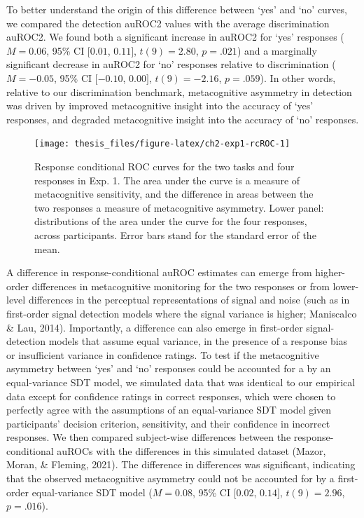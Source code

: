 \documentclass[12pt,twoside]{reedthesis}
\begin{document}
To better understand the origin of this difference between `yes' and `no' curves, we compared the detection auROC2 values with the average discrimination auROC2. We found both a significant increase in auROC2 for `yes' responses (\(M = 0.06\), 95\% CI \([0.01\), \(0.11]\), \(t(9) = 2.80\), \(p = .021\)) and a marginally significant decrease in auROC2 for `no' responses relative to discrimination (\(M = -0.05\), 95\% CI \([-0.10\), \(0.00]\), \(t(9) = -2.16\), \(p = .059\)). In other words, relative to our discrimination benchmark, metacognitive asymmetry in detection was driven by improved metacognitive insight into the accuracy of `yes' responses, and degraded metacognitive insight into the accuracy of `no' responses.
\begin{figure}
\texttt{[image: thesis\_files/figure-latex/ch2-exp1-rcROC-1]} \caption[Response conditional ROC curves for Experiment 1]{Response conditional ROC curves for the two tasks and four responses in Exp. 1. The area under the curve is a measure of metacognitive sensitivity, and the difference in areas between the two responses a measure of metacognitive asymmetry. Lower panel: distributions of the area under the curve for the four responses, across participants. Error bars stand for the standard error of the mean.}\label{fig:ch2-exp1-rcROC}
\end{figure}
A difference in response-conditional auROC estimates can emerge from higher-order differences in metacognitive monitoring for the two responses or from lower-level differences in the perceptual representations of signal and noise (such as in first-order signal detection models where the signal variance is higher; Maniscalco \& Lau, 2014). Importantly, a difference can also emerge in first-order signal-detection models that assume equal variance, in the presence of a response bias or insufficient variance in confidence ratings. To test if the metacognitive asymmetry between `yes' and `no' responses could be accounted for a by an equal-variance SDT model, we simulated data that was identical to our empirical data except for confidence ratings in correct responses, which were chosen to perfectly agree with the assumptions of an equal-variance SDT model given participants' decision criterion, sensitivity, and their confidence in incorrect responses. We then compared subject-wise differences between the response-conditional auROCs with the differences in this simulated dataset (Mazor, Moran, \& Fleming, 2021). The difference in differences was significant, indicating that the observed metacognitive asymmetry could not be accounted for by a first-order equal-variance SDT model (\(M = 0.08\), 95\% CI \([0.02\), \(0.14]\), \(t(9) = 2.96\), \(p = .016\)).
\end{document}
